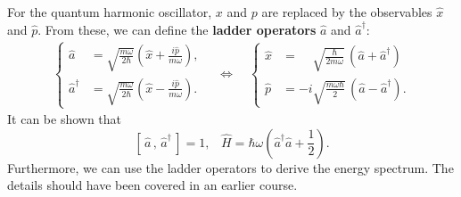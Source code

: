 \documentclass[prx,12pt]{revtex4-2}
\begin{document}
For the quantum harmonic oscillator, $x$ and $p$ are replaced by the
observables $\hat{x}$ and $\hat{p}$.  From these, we can define the
\textbf{ladder operators} $\hat{a}$ and $\hat{a}^\dagger$:
\begin{align}
  \left\{
  \begin{aligned}
  \hat{a} &= \sqrt{\frac{m\omega}{2\hbar}} \left(\hat{x} + \frac{i\hat{p}}{m\omega}\right), \\
  \hat{a}^\dagger &= \sqrt{\frac{m\omega}{2\hbar}} \left(\hat{x} - \frac{i\hat{p}}{m\omega}\right).
  \end{aligned}\right. \quad
  \Leftrightarrow\quad\left\{
  \begin{aligned}
    \hat{x} &= \;\;\;\;\sqrt{\frac{\hbar}{2m\omega}}
    \, \left(\hat{a}+\hat{a}^\dagger\right) \\
    \hat{p} &= -i \sqrt{\frac{m\omega\hbar}{2}}
    \, \left(\hat{a}-\hat{a}^\dagger\right).
  \end{aligned}\right.
  \label{create_annihilate}
\end{align}
It can be shown that
\begin{equation}
  \left[\,\hat{a}\,,\,\hat{a}^\dagger\,\right] = 1, \;\;\;
  \hat{H} = \hbar\omega\left(\hat{a}^\dagger\hat{a}+\frac{1}{2}\right).
  \label{create_annihilate_qho}
\end{equation}
Furthermore, we can use the ladder operators to derive the energy
spectrum.  The details should have been covered in an earlier course.
\end{document}
